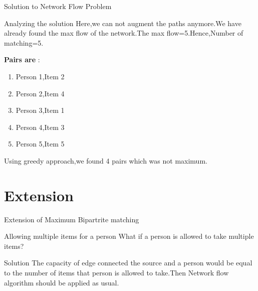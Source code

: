 \documentclass{beamer}
\begin{document}
\begin{frame}{Solution to Network Flow Problem}
\begin{tikzpicture}
            
            

        \end{tikzpicture}

    
    
\end{frame}
\begin{frame}{Analyzing the solution}
            Here,we can not augment the paths anymore.We have already found the max flow of the network.The max flow=5.Hence,Number of matching=5.
        
        \textbf{Pairs are} : 
        \begin{enumerate}
            \item Person 1,Item 2
            \item Person 2,Item 4
            \item Person 3,Item 1
            \item Person 4,Item 3
            \item Person 5,Item 5
        \end{enumerate}
        Using greedy approach,we found 4 pairs which was not maximum.
\end{frame}
\section{Extension}
\begin{frame}{Extension of Maximum Bipartrite matching}
    \begin{block}{Allowing multiple items for a person}
    What if a person is allowed to take multiple items?
\end{block}
    \begin{block}{Solution}
        The capacity of edge connected the source and a person would be equal to the number of items that person is allowed to take.Then Network flow algorithm should be applied as usual.
    \end{block}
\end{frame}
\end{document}
